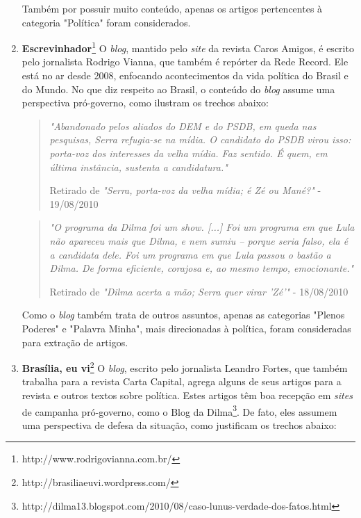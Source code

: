 \begin{enumerate}
Também por possuir muito conteúdo, apenas os artigos pertencentes à categoria "Política" foram considerados.

\item \textbf{Escrevinhador}\footnote{http://www.rodrigovianna.com.br/} O \emph{blog}, mantido pelo \emph{site} da revista Caros Amigos, é escrito pelo jornalista Rodrigo Vianna, que também é repórter da Rede Record. Ele está no ar desde 2008, enfocando acontecimentos da vida política do Brasil e do Mundo. No que diz respeito ao Brasil, o conteúdo do \emph{blog} assume uma perspectiva pró-governo, como ilustram os trechos abaixo:

\begin{quote}

\emph{"Abandonado pelos aliados do DEM e do PSDB, em queda nas pesquisas, Serra refugia-se na mídia. O candidato do PSDB virou isso: porta-voz dos interesses da velha mídia. Faz sentido. É quem, em última instância, sustenta a candidatura."}

{\small Retirado de \emph{"Serra, porta-voz da velha mídia; é Zé ou Mané?"} - 19/08/2010}
\end{quote}

\begin{quote}
\emph{"O programa da Dilma foi um show. [...] Foi um programa em que Lula não apareceu mais que Dilma, e nem sumiu – porque seria falso, ela é a candidata dele. Foi um programa em que Lula passou o bastão a Dilma. De forma eficiente, corajosa e, ao mesmo tempo, emocionante."}

{\small Retirado de \emph{"Dilma acerta a mão; Serra quer virar 'Zé'"} - 18/08/2010}

\end{quote}

Como o \emph{blog} também trata de outros assuntos, apenas as categorias "Plenos Poderes" e "Palavra Minha", mais direcionadas à política, foram consideradas para extração de artigos.

\item \textbf{Brasília, eu vi}\footnote{http://brasiliaeuvi.wordpress.com/} O \emph{blog}, escrito pelo jornalista Leandro Fortes, que também trabalha para a revista Carta Capital, agrega alguns de seus artigos para a revista e outros textos sobre política. Estes artigos têm boa recepção em \emph{sites} de campanha pró-governo, como o Blog da Dilma\footnote{http://dilma13.blogspot.com/2010/08/caso-lunus-verdade-dos-fatos.html}. De fato, eles assumem uma perspectiva de defesa da situação, como justificam os trechos abaixo:



\end{enumerate}

